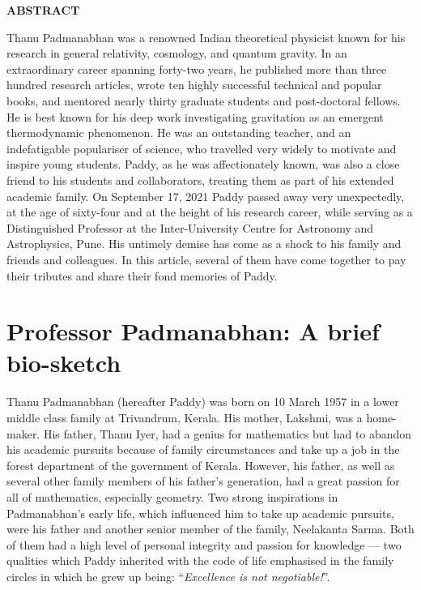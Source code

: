 \documentclass[prd, preprint, longbibliography, 12pt]{revtex4-2}
\begin{document}
\newpage
\centerline{\bf ABSTRACT}
\medskip
\noindent Thanu Padmanabhan was a renowned Indian theoretical physicist known for his research in general relativity, cosmology, and quantum gravity. In an extraordinary career spanning forty-two years, he published more than three hundred research articles, wrote ten highly successful technical and popular books, and mentored nearly thirty graduate students and post-doctoral fellows. He is best known for his deep work investigating gravitation as an emergent thermodynamic phenomenon. He was an outstanding teacher, and an indefatigable populariser of science, who travelled very widely to motivate and inspire young students. Paddy, as he was affectionately known, was also a close friend to his students and collaborators, treating them as part of his extended academic family. On September 17, 2021 Paddy passed away very unexpectedly, at the age of sixty-four and at the height of his research career, while serving as a Distinguished Professor at the Inter-University Centre for Astronomy and Astrophysics, Pune. His untimely demise has come as a shock to his family and friends and colleagues. In this article, several  of them have come together to pay their tributes and share their fond memories of Paddy.

\newpage

\section{Professor Padmanabhan: A brief bio-sketch}




\noindent  Thanu Padmanabhan (hereafter Paddy)  was born on 10 March 1957 in a
lower middle class family at Trivandrum, Kerala.  
His mother, Lakshmi, was a home-maker. His father, Thanu Iyer, had  a
genius for mathematics but had to abandon his academic pursuits
because of family circumstances and take up a job in the forest
department of the government of Kerala.
However, his father, as well as several other family members of his
father's generation,  had a great passion for all of mathematics,
especially geometry.  
Two strong inspirations in Padmanabhan's early life, which influenced
him to take up academic pursuits, were his father and another senior
member of the family, Neelakanta Sarma.
Both of them had a high level of personal integrity and passion for
knowledge --- two qualities which Paddy inherited  with  the code of
life emphasised in the family circles in which he grew up being:
``\textit{Excellence is not negotiable!}''. 
\end{document}
